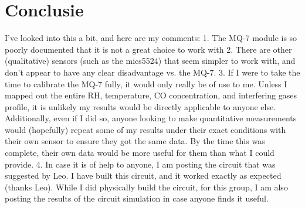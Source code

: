 
\chapter{Conclusie}%
\label{ch:conclusie}


I've looked into this a bit, and here are my comments:
1.	The MQ-7 module is so poorly documented that it is not a great choice to work with
2.	There are other (qualitative) sensors (such as the mics5524) that seem simpler to work with, and don't appear to have any clear disadvantage vs. the MQ-7.
3.	If I were to take the time to calibrate the MQ-7 fully, it would only really be of use to me. Unless I mapped out the entire RH, temperature, CO concentration, and interfering gases profile, it is unlikely my results would be directly applicable to anyone else. Additionally, even if I did so, anyone looking to make quantitative measurements would (hopefully) repeat some of my results under their exact conditions with their own sensor to ensure they got the same data. By the time this was complete, their own data would be more useful for them than what I could provide.
4.	In case it is of help to anyone, I am posting the circuit that was suggested by Leo. I have built this circuit, and it worked exactly as expected (thanks Leo). While I did physically build the circuit, for this group, I am also posting the results of the circuit simulation in case anyone finds it useful.




